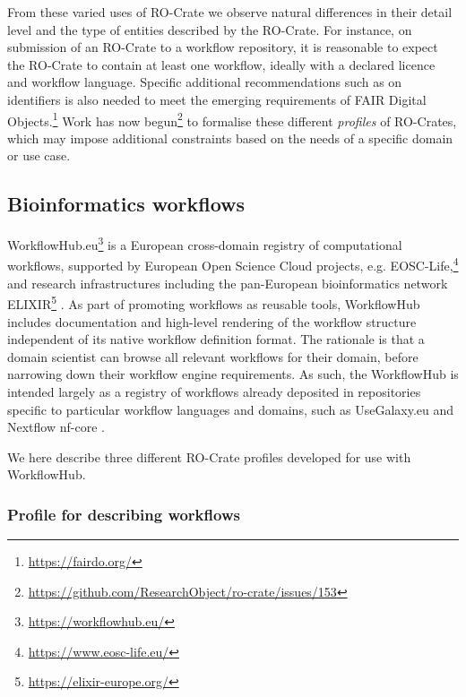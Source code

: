 \documentclass[ds,v1.1.2,openaccess]{iosart2x}%
\begin{document}
From these varied uses of RO-Crate we observe natural differences in
their detail level and the type of entities described by the RO-Crate.
For instance, on submission of an RO-Crate to a workflow repository, it
is reasonable to expect the RO-Crate to contain at least one workflow,
ideally with a declared licence and workflow language. Specific
additional recommendations such as on identifiers is also needed to
meet the emerging requirements of FAIR Digital
Objects.\footnote{\url{https://fairdo.org/}} Work has now
begun\footnote{\url{https://github.com/ResearchObject/ro-crate/issues/153}} to
formalise these different \textit{profiles} of RO-Crates, which may impose
additional constraints based on the needs of a specific domain or use case.

\subsection{Bioinformatics workflows}%

\label{sec:workflows}

WorkflowHub.eu\footnote{\url{https://workflowhub.eu/}} is a European cross-domain
registry of computational workflows, supported by European Open Science
Cloud projects, e.g. EOSC-Life,\footnote{\url{https://www.eosc-life.eu/}} and
research infrastructures including the pan-European bioinformatics
network ELIXIR\footnote{\url{https://elixir-europe.org/}}
\cite{doi:10.1016/j.tibtech.2012.02.002}. As part of promoting workflows as
reusable tools, WorkflowHub includes documentation and high-level
rendering of the workflow structure independent of its native workflow
definition format. The rationale is that a domain scientist can browse
all relevant workflows for their domain, before narrowing down their
workflow engine requirements. As such, the WorkflowHub is intended
largely as a registry of workflows already deposited in repositories
specific to particular workflow languages and domains, such as
UseGalaxy.eu \cite{doi:10.1371/journal.ppat.1008643} and Nextflow nf-core
\cite{doi:10.1038/s41587-020-0439-x}.

We here describe three different RO-Crate profiles developed for use
with WorkflowHub.

\subsubsection{Profile for describing workflows}
\end{document}
